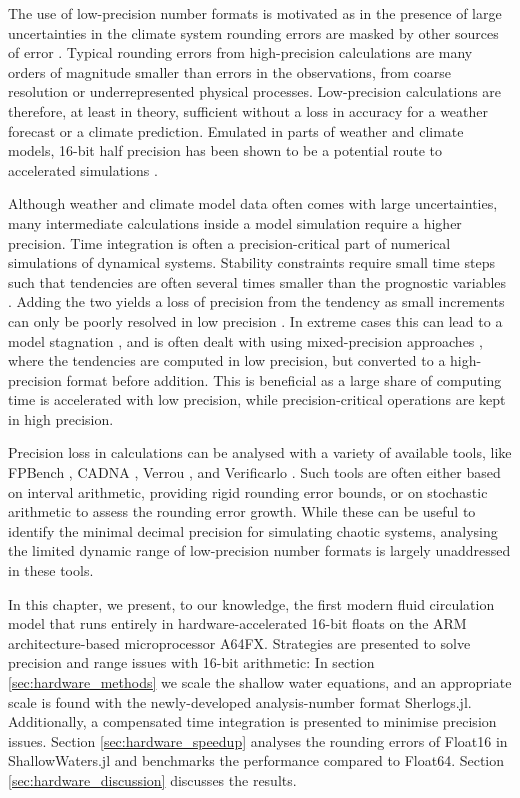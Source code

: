 The use of low-precision number formats is motivated as in the presence of large uncertainties in the climate system rounding
errors are masked by other sources of error \citep{Palmer2015}. Typical rounding errors from high-precision calculations are
many orders of magnitude smaller than errors in the observations, from coarse resolution or underrepresented physical processes.
Low-precision calculations are therefore, at least in theory, sufficient without a loss in accuracy for a weather forecast or a climate prediction.
Emulated in parts of weather and climate models, 16-bit half precision has been shown to be a potential route to accelerated simulations
\citep{Dawson2018,Chantry2019, Hatfield2019, Klower2020a}.

Although weather and climate model data often comes with large uncertainties, many intermediate calculations inside a model simulation
require a higher precision. Time integration is often a precision-critical part of numerical simulations of dynamical systems. Stability constraints
require small time steps such that tendencies are often several times smaller than the prognostic variables \citep{Courant1967}.
Adding the two yields a loss of precision from the tendency as small increments can only be poorly resolved in low precision
\citep{Gill1951,Kahan1965,Moller1965}. In extreme cases this can lead to a model stagnation \citep{Croci2020}, and is often
dealt with using mixed-precision approaches \citep{Dawson2018,Klower2020a,TintoPrims2019}, where the tendencies are computed
in low precision, but converted to a high-precision format before addition. This is beneficial as a large share of computing time is
accelerated with low precision, while precision-critical operations are kept in high precision.

Precision loss in calculations can be analysed with a variety of available tools, like FPBench \citep{Damouche2017},
CADNA \citep{Jezequel2008}, Verrou \citep{Fevotte2019}, and Verificarlo \citep{Denis2016}. Such tools are often either
based on interval arithmetic, providing rigid rounding error bounds, or on stochastic arithmetic to assess the rounding error growth.
While these can be useful to identify the minimal decimal precision for simulating chaotic systems, analysing the limited dynamic range
of low-precision number formats is largely unaddressed in these tools.

In this chapter, we present, to our knowledge, the first modern fluid circulation model that runs entirely in hardware-accelerated 16-bit floats on the
ARM architecture-based microprocessor A64FX. Strategies are presented to solve precision and range issues with 16-bit arithmetic:
In section \ref{sec:hardware_methods} we scale the shallow water equations, and an appropriate scale is found with the
newly-developed analysis-number format Sherlogs.jl. Additionally, a compensated time integration is presented to minimise
precision issues. Section \ref{sec:hardware_speedup} analyses the rounding errors of Float16 in ShallowWaters.jl and
benchmarks the performance compared to Float64. Section \ref{sec:hardware_discussion} discusses the results.

